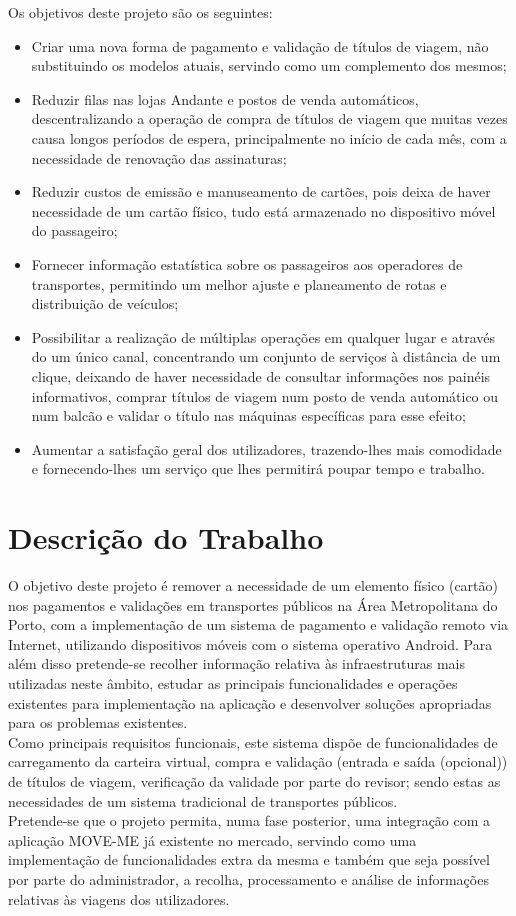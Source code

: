 \documentclass[9pt,a4paper]{extarticle}
\begin{document}
\begin{multicols}{2}
Os objetivos deste projeto são os seguintes:
\begin{itemize}
\item Criar uma nova forma de pagamento e validação de títulos de viagem, não substituindo os modelos atuais, servindo como um complemento dos mesmos;
\item Reduzir filas nas lojas Andante e postos de venda automáticos, descentralizando a operação de compra de títulos de viagem que muitas vezes causa longos períodos de espera, principalmente no início de cada mês, com a necessidade de renovação das assinaturas;
\item Reduzir custos de emissão e manuseamento de cartões, pois deixa de haver necessidade de um cartão físico, tudo está armazenado no dispositivo móvel do passageiro;
\item Fornecer informação estatística sobre os passageiros aos operadores de transportes, permitindo um melhor ajuste e planeamento de rotas e distribuição de veículos;
\item Possibilitar a realização de múltiplas operações em qualquer lugar e através do um único canal, concentrando um conjunto de serviços à distância de um clique, deixando de haver necessidade de consultar informações nos painéis informativos, comprar títulos de viagem num posto de venda automático ou num balcão e validar o título nas máquinas específicas para esse efeito;
\item Aumentar a satisfação geral dos utilizadores, trazendo-lhes mais comodidade e fornecendo-lhes um serviço que lhes permitirá poupar tempo e trabalho.
\end{itemize}


\section{Descrição do Trabalho}\label{sec:work}

O objetivo deste projeto é remover a necessidade de um elemento físico (cartão) nos pagamentos e validações em transportes públicos na Área Metropolitana do Porto, com a implementação de um sistema de pagamento e validação remoto via Internet, utilizando dispositivos móveis com o sistema operativo Android. Para além disso pretende-se recolher informação relativa às infraestruturas mais utilizadas neste âmbito, estudar as principais funcionalidades e operações existentes para implementação na aplicação e desenvolver soluções apropriadas para os problemas existentes.
\\Como principais requisitos funcionais, este sistema dispõe de funcionalidades de carregamento da carteira virtual, compra e validação (entrada e saída (opcional)) de títulos de viagem, verificação da validade por parte do revisor; sendo estas as necessidades de um sistema tradicional de transportes públicos.\cite{Buttyan2009}
\\Pretende-se que o projeto permita, numa fase posterior, uma integração com a aplicação MOVE-ME já existente no mercado, servindo como uma implementação de funcionalidades extra da mesma e também que seja possível por parte do administrador, a recolha, processamento e análise de informações relativas às viagens dos utilizadores.


\end{multicols}
\end{document}
